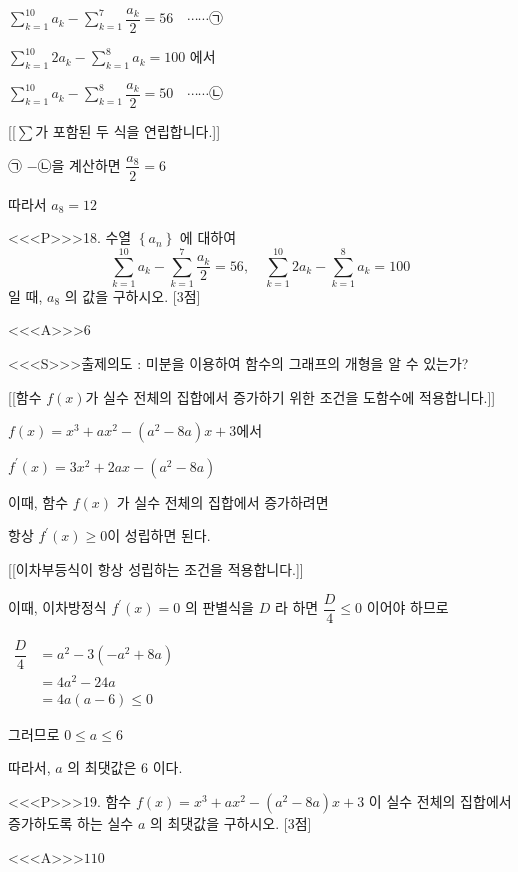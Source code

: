 \documentclass{oblivoir}
\begin{document}
$\displaystyle\sum_{k=1}^{10} a_{k}-\displaystyle\sum_{k=1}^{7} \dfrac{a_{k}}{2}=56 \quad \cdots \cdots $㉠

$\displaystyle\sum_{k=1}^{10} 2 a_{k}-\displaystyle\sum_{k=1}^{8} a_{k}=100$ 에서

$\displaystyle\sum_{k=1}^{10} a_{k}-\displaystyle\sum_{k=1}^{8} \dfrac{a_{k}}{2}=50 \quad \cdots \cdots $㉡

[[$\displaystyle\sum$가 포함된 두 식을 연립합니다.]]

㉠ $-$㉡을 계산하면  $\dfrac{a_{8}}{2}=6$

따라서 $a_{8}=12$

<<<P>>>18. 수열 $\left\{a_{n}\right\}$ 에 대하여
$$
\displaystyle\sum_{k=1}^{10} a_{k}-\displaystyle\sum_{k=1}^{7} \dfrac{a_{k}}{2}=56, \quad \displaystyle\sum_{k=1}^{10} 2 a_{k}-\displaystyle\sum_{k=1}^{8} a_{k}=100
$$
일 때, $a_{8}$ 의 값을 구하시오. [3점]



<<<A>>>$6$

<<<S>>>출제의도 : 미분을 이용하여 함수의 그래프의 개형을 알 수 있는가?

[[함수 $f(x)$가 실수 전체의 집합에서 증가하기 위한 조건을 도함수에 적용합니다.]]

$f(x)=x^{3}+a x^{2}-\left(a^{2}-8 a\right) x+3$에서

$f^{\prime}(x)=3 x^{2}+2 a x-\left(a^{2}-8 a\right)$

이때, 함수 $f(x)$ 가 실수 전체의 집합에서 증가하려면

항상 $f^{\prime}(x) \geq 0$이 성립하면 된다.

[[이차부등식이 항상 성립하는 조건을 적용합니다.]]

이때, 이차방정식 $f^{\prime}(x)=0$ 의 판별식을 $D$ 라 하면 $\dfrac{D}{4} \leq 0$ 이어야 하므로

$\begin{aligned} \dfrac{D}{4} &=a^{2}-3\left(-a^{2}+8 a\right)\\
&=4 a^{2}-24 a\\
&=4 a(a-6) \leq 0 \end{aligned}$

그러므로 $0 \leq a \leq 6$

따라서, $a$ 의 최댓값은 $6$ 이다.



<<<P>>>19. 함수 $f(x)=x^{3}+a x^{2}-\left(a^{2}-8 a\right) x+3$ 이 실수 전체의 집합에서 증가하도록 하는 실수 $a$ 의 최댓값을 구하시오. [3점]


<<<A>>>$110$
\end{document}
